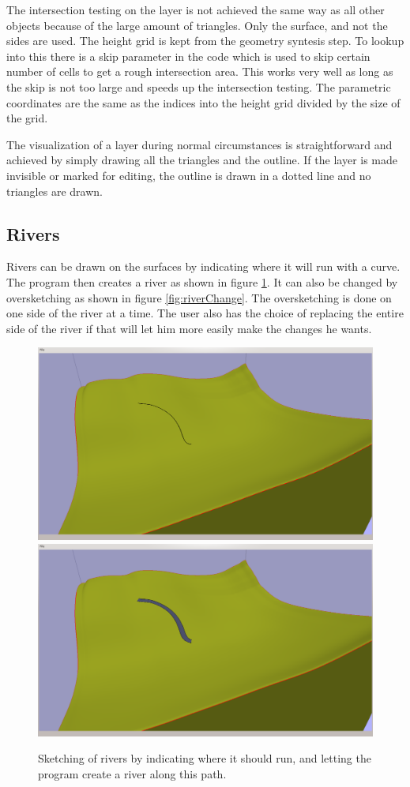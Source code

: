 \documentclass[a4paper,12pt]{report}
\begin{document}
The intersection testing on the layer is not achieved the same way as all other objects because of the large amount of triangles. Only the surface, and not the sides are used. The height grid is kept from the geometry syntesis step. To lookup into this there is a skip parameter in the code which is used to skip certain number of cells to get a rough intersection area. This works very well as long as the skip is not too large and speeds up the intersection testing. The parametric coordinates are the same as the indices into the height grid divided by the size of the grid.

The visualization of a layer during normal circumstances is straightforward and achieved by simply drawing all the triangles and the outline. If the layer is made invisible or marked for editing, the outline is drawn in a dotted line and no triangles are drawn.

\subsection{Rivers}
Rivers can be drawn on the surfaces by indicating where it will run with a curve. The program then creates a river as shown in figure \ref{fig:riverDraw}. It can also be changed by oversketching as shown in figure \ref{fig:riverChange}. The oversketching is done on one side of the river at a time. The user also has the choice of replacing the entire side of the river if that will let him more easily make the changes he wants.

\begin{figure}
\includegraphics[trim = 30mm 80mm 120mm 30mm, clip,width=.5\linewidth]{thesis/results/riverDraw.png}
\includegraphics[trim = 30mm 80mm 120mm 30mm, clip,width=.5\linewidth]{thesis/results/riverDrawn.png}
 \caption{Sketching of rivers by indicating where it should run, and letting the program create a river along this path. }
 \label{fig:riverDraw}
\end{figure}
\end{document}

